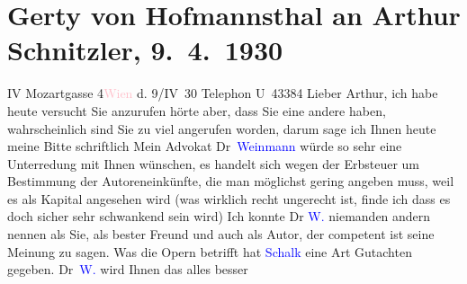

               \section[Gerty von Hofmannsthal an Arthur Schnitzler, 9. 4. 1930]{ Gerty von Hofmannsthal an Arthur Schnitzler, 9. 4. 1930}\nopagebreak{}\rehead{ }\normalsize\beginnumbering{} \toendnotes[C]{\smallbreak\pagebreak[2]} 
\toendnotes[C]{\smallbreak}\pstart
           \noindent{}{\pb}IV Mozartgasse 4\hfill \textcolor{pink}{Wien}{}\ledrightnote{\textcolor{pink}{Wien}} d. 9/IV 30\pend
           \pstart
           Telephon U 43384\pend
           \pstart
           Lieber Arthur, ich habe heute versucht Sie anzurufen hörte
                    aber, dass Sie eine andere \label{K_L02535_1v}\label{K_L02535_1h} haben, wahrscheinlich sind Sie zu viel angerufen worden, darum sage ich
                    Ihnen heute meine Bitte schriftlich\pend
           \pstart
           Mein Advokat Dr \textcolor{blue}{Weinmann}{}\ledrightnote{\textcolor{blue}{Leonhard Weinmann}} würde so sehr eine
                    Unterredung mit Ihnen wünschen, es handelt sich wegen der Erbsteuer um
                    Bestimmung der Autoreneinkünfte, die man möglichst gering angeben muss, weil es
                    als Kapital angesehen wird (was wirklich recht ungerecht ist, finde ich dass es
                    doch sicher sehr schwankend sein wird) Ich konnte Dr \textcolor{blue}{W.}{}\ledrightnote{\textcolor{blue}{Leonhard Weinmann}} niemanden andern nennen als Sie, als bester Freund und
                    auch als Autor, der competent ist seine Meinung zu sagen. Was die Opern betrifft
                    hat \textcolor{blue}{Schalk}{}\ledrightnote{\textcolor{blue}{Franz Schalk}} eine Art Gutachten gegeben.
                        Dr \textcolor{blue}{W.}{}\ledrightnote{\textcolor{blue}{Leonhard Weinmann}} wird Ihnen das alles besser
